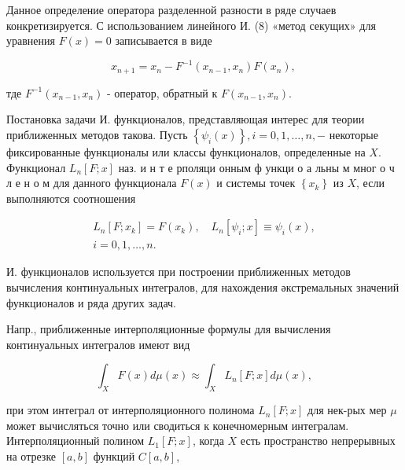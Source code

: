 \documentclass[10pt]{article}
\begin{document}
Данное определение оператора разделенной разности в ряде случаев конкретизируется. С использованием линейного И. (8) «метод секущих» для уравнения $F(x)=0$ записывается в виде



\[

x_{n+1}=x_{n}-F^{-1}\left(x_{n-1}, x_{n}\right) F\left(x_{n}\right) \text {, }

\]



тде $F^{-1}\left(x_{n-1}, x_{n}\right)$ - оператор, обратный к $F\left(x_{n-1}, x_{n}\right)$.



Постановка задачи И. функционалов, представляющая интерес для теории приближенных методов такова. Пусть $\left\{\psi_{i}(x)\right\}, i=0,1, \ldots, n,-$ некоторые фиксированные функционалы или классы функционалов, определенные на $X$. Функционал $L_{n}[F ; x]$ наз. и н т е рполяци онным ф ункци о а льны м мног о ч л е н о м для данного функционала $F(x)$ и системы точек $\left\{x_{k}\right\}$ из $X$, если выполняются соотношения



\[

\begin{gathered}

L_{n}\left[F ; x_{k}\right]=F\left(x_{k}\right), \quad L_{n}\left[\psi_{i} ; x\right] \equiv \psi_{i}(x), \\

i=0,1, \ldots, n .

\end{gathered}

\]



И. функционалов используется при построении приближенных методов вычисления континуальных интегралов, для нахождения әкстремальных значений функционалов и ряда других задач.



Напр., приближенные интерполяционные формулы для вычисления континуальных интегралов имеют вид



\[

\int_{X} F(x) d \mu(x) \approx \int_{X} L_{n}[F ; x] d \mu(x),

\]



при этом интеграл от интерполяционного полинома $L_{n}[F ; x]$ для нек-рых мер $\mu$ может вычисляться точно или сводиться к конечномерным интегралам. Интерполяционный полином $L_{1}[F ; x]$, когда $X$ есть пространство непрерывных на отрезке $[a, b]$ функций $C[a, b]$,
\end{document}
